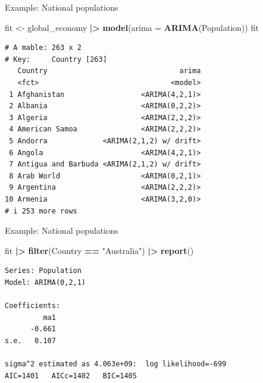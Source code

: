 \documentclass[
  14pt,
  ignorenonframetext,
  aspectratio=169,
]{beamer}
\newenvironment{Shaded}{\begin{snugshade}}{\end{snugshade}}
\newcommand{\AttributeTok}[1]{\textcolor[rgb]{0.13,0.29,0.53}{#1}}
\newcommand{\FunctionTok}[1]{\textcolor[rgb]{0.13,0.29,0.53}{\textbf{#1}}}
\newcommand{\NormalTok}[1]{#1}
\newcommand{\OtherTok}[1]{\textcolor[rgb]{0.56,0.35,0.01}{#1}}
\newcommand{\SpecialCharTok}[1]{\textcolor[rgb]{0.81,0.36,0.00}{\textbf{#1}}}
\newcommand{\StringTok}[1]{\textcolor[rgb]{0.31,0.60,0.02}{#1}}
\renewenvironment{Shaded}{\vspace*{0.15cm}\color{black}\fontsize{10}{10}\sf\begin{snugshade}\color{black}}{\end{snugshade}}
\begin{document}
\begin{frame}[fragile]{Example: National populations}
\protect{}\label{example-national-populations}
\fontsize{11}{12}\sf

\begin{Shaded}
\begin{Highlighting}[]
\NormalTok{fit }\OtherTok{\textless{}{-}}\NormalTok{ global\_economy }\SpecialCharTok{|\textgreater{}}
  \FunctionTok{model}\NormalTok{(}\AttributeTok{arima =} \FunctionTok{ARIMA}\NormalTok{(Population))}
\NormalTok{fit}
\end{Highlighting}
\end{Shaded}

\begin{verbatim}
# A mable: 263 x 2
# Key:     Country [263]
   Country                               arima
   <fct>                               <model>
 1 Afghanistan                  <ARIMA(4,2,1)>
 2 Albania                      <ARIMA(0,2,2)>
 3 Algeria                      <ARIMA(2,2,2)>
 4 American Samoa               <ARIMA(2,2,2)>
 5 Andorra             <ARIMA(2,1,2) w/ drift>
 6 Angola                       <ARIMA(4,2,1)>
 7 Antigua and Barbuda <ARIMA(2,1,2) w/ drift>
 8 Arab World                   <ARIMA(0,2,1)>
 9 Argentina                    <ARIMA(2,2,2)>
10 Armenia                      <ARIMA(3,2,0)>
# i 253 more rows
\end{verbatim}
\end{frame}

\begin{frame}[fragile]{Example: National populations}
\protect{}\label{example-national-populations-1}
\fontsize{11}{12}\sf

\begin{Shaded}
\begin{Highlighting}[]
\NormalTok{fit }\SpecialCharTok{|\textgreater{}}
  \FunctionTok{filter}\NormalTok{(Country }\SpecialCharTok{==} \StringTok{"Australia"}\NormalTok{) }\SpecialCharTok{|\textgreater{}}
  \FunctionTok{report}\NormalTok{()}
\end{Highlighting}
\end{Shaded}

\begin{verbatim}
Series: Population 
Model: ARIMA(0,2,1) 

Coefficients:
         ma1
      -0.661
s.e.   0.107

sigma^2 estimated as 4.063e+09:  log likelihood=-699
AIC=1401   AICc=1402   BIC=1405
\end{verbatim}

\vspace*{3cm}
\end{frame}
\end{document}
